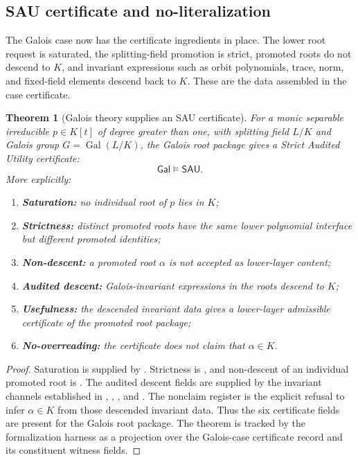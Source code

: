 \documentclass[11pt]{article}
\newcommand{\Gal}{\operatorname{Gal}}
\newtheorem{theorem}{Theorem}[section]
\theoremstyle{definition}
\begin{document}
\subsection{SAU certificate and no-literalization}
\label{subsec:gal-certificate-no-literalization}

The Galois case now has the certificate ingredients in place.  The lower root
request is saturated, the splitting-field promotion is strict, promoted roots do
not descend to \(K\), and invariant expressions such as orbit polynomials,
trace, norm, and fixed-field elements descend back to \(K\).  These are the data
assembled in the case certificate.

\begin{theorem}[Galois theory supplies an SAU certificate]
\label{thm:gal-sau-certificate}
For a monic separable irreducible \(p\in K[t]\) of degree greater than one, with splitting field \(L/K\) and Galois group \(G=\Gal(L/K)\), the Galois root package gives a Strict Audited Utility certificate:
\[
\mathsf{Gal}\models\mathsf{SAU}.
\]
More explicitly:
\begin{enumerate}
\item \textbf{Saturation:} no individual root of \(p\) lies in \(K\);
\item \textbf{Strictness:} distinct promoted roots have the same lower polynomial interface but different promoted identities;
\item \textbf{Non-descent:} a promoted root \(\alpha\) is not accepted as lower-layer content;
\item \textbf{Audited descent:} Galois-invariant expressions in the roots descend to \(K\);
\item \textbf{Usefulness:} the descended invariant data gives a lower-layer admissible certificate of the promoted root package;
\item \textbf{No-overreading:} the certificate does not claim that \(\alpha\in K\).
\end{enumerate}
\end{theorem}

\begin{proof}
Saturation is supplied by .  Strictness is
, and non-descent of an individual promoted root is
.  The audited descent fields are supplied by the
invariant channels established in ,
, , and
.  The nonclaim register is the
explicit refusal to infer \(\alpha\in K\) from those descended invariant data.
Thus the six certificate fields are present for the Galois root package.  The
theorem is tracked by the formalization harness as a projection over the
Galois-case certificate record and its constituent witness fields.
\end{proof}
\end{document}
